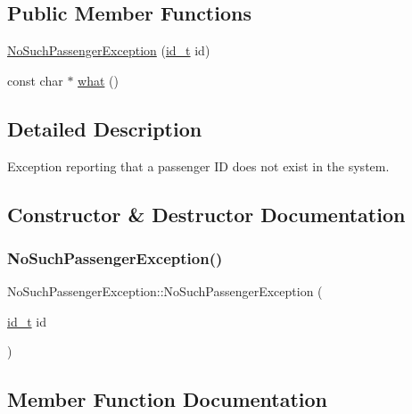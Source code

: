 \subsection*{Public Member Functions}
\begin{DoxyCompactItemize}
\item 
\mbox{\hyperlink{classNoSuchPassengerException_a592e57495c93657a25e7da49da5b6649}{No\+Such\+Passenger\+Exception}} (\mbox{\hyperlink{project__utils_8h_a8f3a969054ad2200720b96e7e23dd4e1}{id\+\_\+t}} id)
\item 
const char $\ast$ \mbox{\hyperlink{classNoSuchPassengerException_a6dcb45902936f5c11beef44030378872}{what}} ()
\end{DoxyCompactItemize}


\subsection{Detailed Description}
Exception reporting that a passenger ID does not exist in the system. 

\subsection{Constructor \& Destructor Documentation}
\mbox{\label{classNoSuchPassengerException_a592e57495c93657a25e7da49da5b6649}} 
\subsubsection{\texorpdfstring{No\+Such\+Passenger\+Exception()}{NoSuchPassengerException()}}
{\footnotesize\ttfamily No\+Such\+Passenger\+Exception\+::\+No\+Such\+Passenger\+Exception (\begin{DoxyParamCaption}\item[{\mbox{\hyperlink{project__utils_8h_a8f3a969054ad2200720b96e7e23dd4e1}{id\+\_\+t}}}]{id }\end{DoxyParamCaption})}



\subsection{Member Function Documentation}
\mbox{\label{classNoSuchPassengerException_a6dcb45902936f5c11beef44030378872}} 
